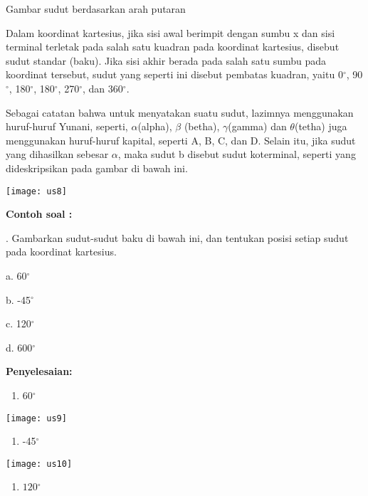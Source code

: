\documentclass[11pt,fleqn]{book} %
\begin{document}
\begin{myEnumerate}
\begin{itemize}
\noindent 

Gambar sudut berdasarkan arah putaran

Dalam koordinat kartesius, jika sisi awal berimpit dengan sumbu x dan sisi terminal terletak pada salah satu kuadran pada koordinat kartesius, disebut sudut standar (baku).  Jika sisi akhir berada pada salah satu sumbu pada koordinat tersebut, sudut yang seperti ini disebut pembatas kuadran, yaitu 0${}^\circ $, 90${}^\circ $, 180${}^\circ $, 180${}^\circ $, 270${}^\circ $, dan 360${}^\circ $.

Sebagai catatan bahwa untuk menyatakan suatu sudut, lazimnya menggunakan huruf-huruf Yunani, seperti, $\alpha$(alpha), $\beta $ (betha), $\gamma$(gamma) dan $\theta$(tetha) juga menggunakan huruf-huruf kapital, seperti A, B, C, dan D.  Selain itu, jika sudut  yang dihasilkan sebesar $\alpha$, maka sudut b disebut sudut koterminal, seperti yang dideskripsikan pada gambar di bawah ini.

\noindent \texttt{[image: us8]}

\noindent \textbf{}

\noindent \textbf{Contoh soal :}

. Gambarkan sudut-sudut baku di bawah ini, dan tentukan posisi setiap sudut pada koordinat kartesius. 

\noindent a. 60${}^\circ $

\noindent b. -45${}^\circ $

\noindent c. 120${}^\circ $ 

\noindent d. 600${}^\circ $

\noindent \textbf{Penyelesaian:}

\begin{enumerate}
\item \textbf{ }60$\boldsymbol{{}^\circ }$
\end{enumerate}

\noindent \texttt{[image: us9]}

\begin{enumerate}
\item  -45$\boldsymbol{{}^\circ }$
\end{enumerate}

\noindent \texttt{[image: us10]}

\noindent 

\noindent 

\begin{enumerate}
\item  $120\boldsymbol{{}^\circ }$
\end{enumerate}


\end{itemize}
\end{myEnumerate}
\end{document}
